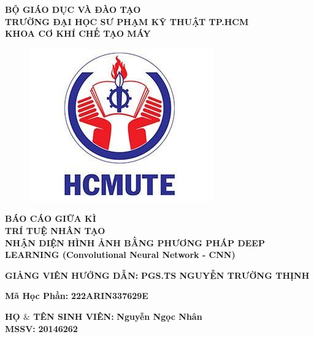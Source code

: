 \documentclass[12pt, a4paper]{article}
\begin{document}
\noindent
\begin{center}
\fontsize{15}{17}\selectfont
\color{black}\textbf{BỘ     GIÁO DỤC VÀ ĐÀO TẠO}\\
\color{blue}\textbf{TRƯỜNG ĐẠI HỌC SƯ PHẠM KỸ THUẬT TP.HCM}\\
\color{black}\textbf{KHOA CƠ KHÍ CHẾ TẠO MÁY}\\

\vspace{50px}
\begin{figure}[h]
    \centering
    \includegraphics[scale=0.8]{Img/logo}
\end{figure}
\vspace{30px}

\fontsize{18}{15}\selectfont
\textbf{BÁO CÁO GIỮA KÌ}\\
\fontsize{24}{18}\selectfont
\color{red}\textbf{ TRÍ TUỆ NHÂN TẠO}\\
\fontsize{13}{13}
\textbf{NHẬN DIỆN HÌNH ẢNH BẰNG PHƯƠNG PHÁP DEEP LEARNING (Convolutional Neural Network - CNN)}


\vspace{50px}

\end{center}


\fontsize{12}{17}\selectfont
\setlength{\parindent}{0cm}
\color{black} \textbf{GIẢNG VIÊN HƯỚNG DẪN:}\hspace{1cm}\color{blue} \textbf{PGS.TS NGUYỄN TRƯỜNG THỊNH} 
\par \color{black} \textbf{Mã Học Phần: }\hspace{4.2cm}\color{blue}\textbf{222ARIN337629E}
\par \color{black} \textbf{HỌ $\&$ TÊN SINH VIÊN:}\hspace{2cm} \color{blue} \textbf{Nguyễn Ngọc Nhân} \\
\color{black} \textbf{MSSV:}\hspace{6cm}\color{blue} \textbf{20146262} \\
\end{document}
